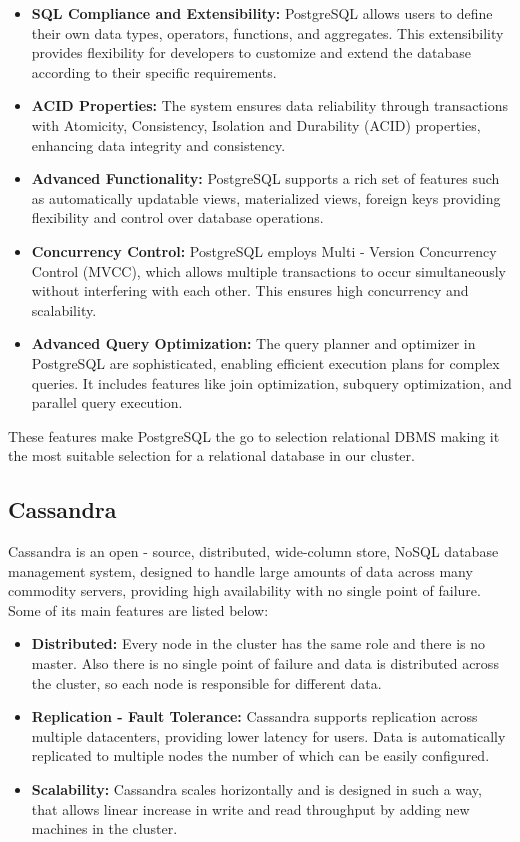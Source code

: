 \documentclass[conference]{IEEEtran}
\begin{document}
\begin{itemize}
	\item \textbf{SQL Compliance and Extensibility:} PostgreSQL allows users to define their own data types, operators, functions, and aggregates. This extensibility
	      provides flexibility for developers to customize and extend the database according to their specific requirements.
	\item \textbf{ACID Properties:} The system ensures data reliability through transactions with Atomicity, Consistency, Isolation and Durability
	      (ACID) properties, enhancing data integrity and consistency.
	\item \textbf{Advanced Functionality:} PostgreSQL supports a rich set of features such as automatically updatable views, materialized views, foreign keys providing
	      flexibility and control over database operations.
	\item \textbf{Concurrency Control:} PostgreSQL employs Multi - Version Concurrency Control (MVCC), which allows multiple transactions to occur simultaneously without interfering with each other. This ensures high concurrency and scalability.
	\item \textbf{Advanced Query Optimization:} The query planner and optimizer in PostgreSQL are sophisticated, enabling efficient execution plans for complex queries.
	      It includes features like join optimization, subquery optimization, and parallel query execution.
\end{itemize}

These features make PostgreSQL the go to selection relational DBMS making it the most suitable selection for a relational database in our cluster.

\subsection{Cassandra}

Cassandra is an open - source, distributed, wide-column store, NoSQL database management system, designed to handle large amounts of data across many commodity servers,
providing high availability with no single point of failure. Some of its main features are listed below:

\begin{itemize}
	\item \textbf{Distributed:} Every node in the cluster has the same role and there is no master. Also there is no single point of failure and data is distributed across the cluster, so
	      each node is responsible for different data.
	\item \textbf{Replication - Fault Tolerance:} Cassandra supports replication across multiple datacenters, providing lower latency for users. Data is automatically replicated to multiple nodes the number
	      of which can be easily configured.
	\item \textbf{Scalability:} Cassandra scales horizontally and is designed in such a way, that allows linear increase in write and read throughput by adding new machines in the cluster.
\end{itemize}
\end{document}
